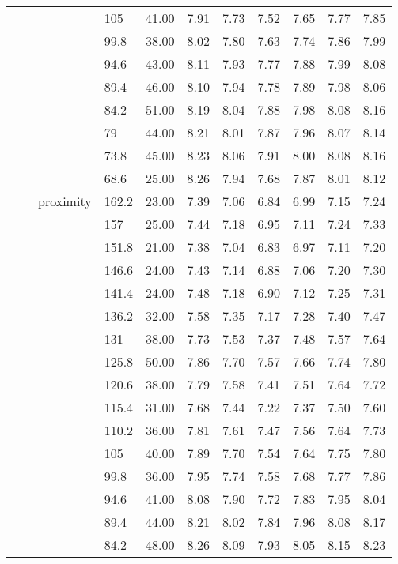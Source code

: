\begin{longtable}{llllrrrrrrr}
   &  &  & 105 & 41.00 & 7.91 & 7.73 & 7.52 & 7.65 & 7.77 & 7.85 \\ 
   &  &  & 99.8 & 38.00 & 8.02 & 7.80 & 7.63 & 7.74 & 7.86 & 7.99 \\ 
   &  &  & 94.6 & 43.00 & 8.11 & 7.93 & 7.77 & 7.88 & 7.99 & 8.08 \\ 
   &  &  & 89.4 & 46.00 & 8.10 & 7.94 & 7.78 & 7.89 & 7.98 & 8.06 \\ 
   &  &  & 84.2 & 51.00 & 8.19 & 8.04 & 7.88 & 7.98 & 8.08 & 8.16 \\ 
   &  &  & 79 & 44.00 & 8.21 & 8.01 & 7.87 & 7.96 & 8.07 & 8.14 \\ 
   &  &  & 73.8 & 45.00 & 8.23 & 8.06 & 7.91 & 8.00 & 8.08 & 8.16 \\ 
   &  &  & 68.6 & 25.00 & 8.26 & 7.94 & 7.68 & 7.87 & 8.01 & 8.12 \\ 
   &  & proximity & 162.2 & 23.00 & 7.39 & 7.06 & 6.84 & 6.99 & 7.15 & 7.24 \\ 
   &  &  & 157 & 25.00 & 7.44 & 7.18 & 6.95 & 7.11 & 7.24 & 7.33 \\ 
   &  &  & 151.8 & 21.00 & 7.38 & 7.04 & 6.83 & 6.97 & 7.11 & 7.20 \\ 
   &  &  & 146.6 & 24.00 & 7.43 & 7.14 & 6.88 & 7.06 & 7.20 & 7.30 \\ 
   &  &  & 141.4 & 24.00 & 7.48 & 7.18 & 6.90 & 7.12 & 7.25 & 7.31 \\ 
   &  &  & 136.2 & 32.00 & 7.58 & 7.35 & 7.17 & 7.28 & 7.40 & 7.47 \\ 
   &  &  & 131 & 38.00 & 7.73 & 7.53 & 7.37 & 7.48 & 7.57 & 7.64 \\ 
   &  &  & 125.8 & 50.00 & 7.86 & 7.70 & 7.57 & 7.66 & 7.74 & 7.80 \\ 
   &  &  & 120.6 & 38.00 & 7.79 & 7.58 & 7.41 & 7.51 & 7.64 & 7.72 \\ 
   &  &  & 115.4 & 31.00 & 7.68 & 7.44 & 7.22 & 7.37 & 7.50 & 7.60 \\ 
   &  &  & 110.2 & 36.00 & 7.81 & 7.61 & 7.47 & 7.56 & 7.64 & 7.73 \\ 
   &  &  & 105 & 40.00 & 7.89 & 7.70 & 7.54 & 7.64 & 7.75 & 7.80 \\ 
   &  &  & 99.8 & 36.00 & 7.95 & 7.74 & 7.58 & 7.68 & 7.77 & 7.86 \\ 
   &  &  & 94.6 & 41.00 & 8.08 & 7.90 & 7.72 & 7.83 & 7.95 & 8.04 \\ 
   &  &  & 89.4 & 44.00 & 8.21 & 8.02 & 7.84 & 7.96 & 8.08 & 8.17 \\ 
   &  &  & 84.2 & 48.00 & 8.26 & 8.09 & 7.93 & 8.05 & 8.15 & 8.23 \\ 

\end{longtable}
